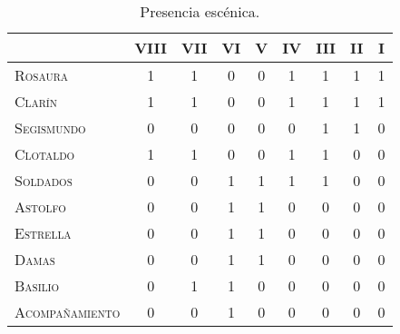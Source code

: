 \begin{table}[h!]
	\centering\footnotesize
	\begin{tabular}{lcccccccc}
		\toprule
		&VIII&VII&VI&V&IV& III&II&I \\
		\midrule
		\textsc{Rosaura}& 1 & 1 & 0 & 0 & 1 & 1 & 1 & 1\\
		\textsc{Clarín}& 1 & 1& 0 & 0 & 1 & 1 & 1 & 1\\
		\textsc{Segismundo}&0&0&0&0&0&1&1&0\\
		\textsc{Clotaldo}&1&1&0&0&1&1&0&0\\
		\textsc{Soldados}&0&0&1&1&1&1&0&0\\
		\textsc{Astolfo}&0&0&1&1&0&0&0&0\\
		\textsc{Estrella}&0&0&1&1&0&0&0&0\\
		\textsc{Damas}&0&0&1&1&0&0&0&0\\
		\textsc{Basilio}&0&1&1&0&0&0&0&0\\
		\textsc{Acompañamiento}&0&0&1&0&0&0&0&0\\
		\bottomrule
	\end{tabular}
	\caption{Presencia escénica.}
	\label{tab:presencia}
\end{table}
